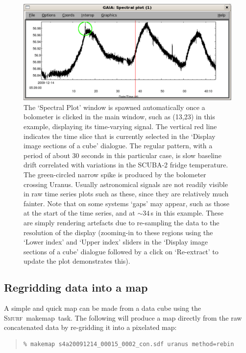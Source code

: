 \documentclass[twoside,11pt]{article}
\newcommand{\xref}[3]{#1}
\newcommand{\xlabel}[1]{}
\renewcommand{\_}{\texttt{\symbol{95}}}
\newenvironment{myquote}{\begin{quote}\begin{small}}{\end{small}\end{quote}}
\newcommand{\smurf}{\xref{\textsc{Smurf}}{sun258}{}}
\newcommand{\task}[1]{\textsf{#1}}
\newcommand{\makemap}{\xref{\task{makemap}}{sun258}{MAKEMAP}}
\begin{document}
\begin{figure}
\begin{center}
\includegraphics[width=0.7\linewidth]{sc19_gaia_spec}
\caption{The `Spectral Plot' window is spawned automatically once a
  bolometer is clicked in the main window, such as (13,23) in this
  example, displaying its time-varying signal. The vertical red line
  indicates the time slice that is currently selected in the `Display
  image sections of a cube' dialogue. The regular pattern, with a
  period of about 30 seconds in this particular case, is slow baseline
  drift correlated with variations in the SCUBA-2 fridge
  temperature. The green-circled narrow spike is produced by the
  bolometer crossing Uranus. Usually astronomical signals are not
  readily visible in raw time series plots such as these, since they
  are relatively much fainter. Note that on some systems `gaps' may
  appear, such as those at the start of the time series, and at
  $\sim34$\,s in this example. These are simply rendering artefacts
  due to re-sampling the data to the resolution of the display
  (zooming-in to these regions using the `Lower index' and `Upper
  index' sliders in the `Display image sections of a cube' dialogue
  followed by a click on `Re-extract' to update the plot demonstrates
  this).}
\label{fig:gaia_spec}
\end{center}
\end{figure}

\subsection{\xlabel{regrid_map}Regridding data into a map}

A simple and quick map can be made from a data cube using the \smurf\
\makemap\ task. The following will produce a map directly from the raw
concatenated data by re-gridding it into a pixelated map:

\begin{myquote}
\begin{verbatim}
% makemap s4a20091214_00015_0002_con.sdf uranus method=rebin
\end{verbatim}
\end{myquote}
\end{document}

